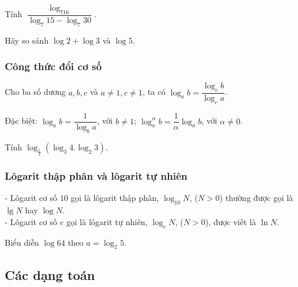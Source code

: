 \begin{vd} %
Tính $\dfrac{\log_716}{\log_7 15 - \log_7 30} .$
\end{vd}

\begin{vd}%
Hãy so sánh $\log 2+\log 3$ và $\log 5$.
\end{vd}
\subsubsection{Công thức đổi cơ số}
Cho ba số dương $a, b, c$ và $a\neq 1, c\neq 1$, ta có $\log_ab=\dfrac{\log_cb}{\log_ca}$. 

Đặc biệt: $\log_ab=\dfrac{1}{\log_ba}$, với $b\neq 1$; $\log_a^{\alpha}b=\dfrac{1}{\alpha}\log_ab$, với $\alpha\neq 0$.

\begin{vd}%
	Tính $\log_\frac{1}{4} \left(\log_3 4. \log_ 2 3 \right)$.
\end{vd}

\subsubsection{Lôgarit thập phân và lôgarit tự nhiên}
- Lôgarit cơ số $10$ gọi là lôgarit thập phân, $\log_{10}N$, ($N>0$) thường được gọi là $\lg N$ hay $\log N$.\\
- Lôgarit cơ số $e$ gọi là lôgarit tự nhiên, $\log_eN$, ($N>0$), được viết là $\ln N$.

\begin{vd}%
Biểu diễn $\log 64$ theo $a = \log_2 5$.	

\end{vd}


\subsection{Các dạng toán}

